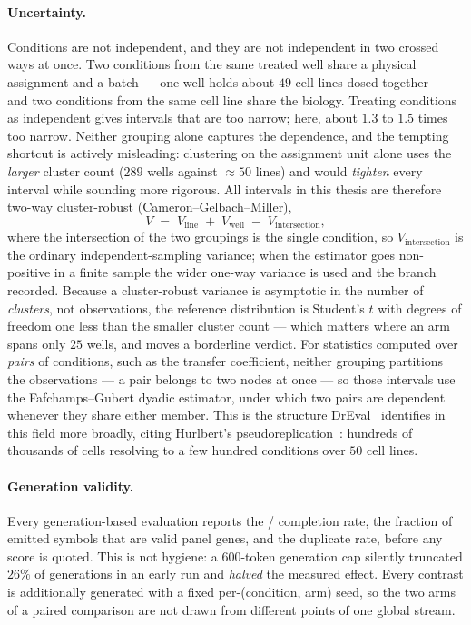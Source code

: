 \paragraph{Uncertainty.} Conditions are not independent, and they are not independent in two
crossed ways at once. Two conditions from the same treated well share a physical assignment and a
batch --- one well holds about $49$ cell lines dosed together --- and two conditions from the same
cell line share the biology. Treating conditions as independent gives intervals that are too
narrow; here, about $1.3$ to $1.5$ times too narrow. Neither grouping alone captures the
dependence, and the tempting shortcut is actively misleading: clustering on the assignment unit
alone uses the \emph{larger} cluster count ($289$ wells against $\approx 50$ lines) and would
\emph{tighten} every interval while sounding more rigorous. All intervals in this thesis are
therefore two-way cluster-robust (Cameron--Gelbach--Miller),
\begin{equation}
  V \;=\; V_{\textrm{line}} \;+\; V_{\textrm{well}} \;-\; V_{\textrm{intersection}},
\end{equation}
where the intersection of the two groupings is the single condition, so $V_{\textrm{intersection}}$
is the ordinary independent-sampling variance; when the estimator goes non-positive in a finite
sample the wider one-way variance is used and the branch recorded. Because a cluster-robust
variance is asymptotic in the number of \emph{clusters}, not observations, the reference
distribution is Student's $t$ with degrees of freedom one less than the smaller cluster count ---
which matters where an arm spans only $25$ wells, and moves a borderline verdict. For statistics
computed over \emph{pairs} of conditions, such as the transfer coefficient, neither grouping
partitions the observations --- a pair belongs to two nodes at once --- so those intervals use the
Fafchamps--Gubert dyadic estimator, under which two pairs are dependent whenever they share either
member. This is the structure DrEval~\cite{dreval} identifies in this field more broadly, citing
Hurlbert's pseudoreplication~\cite{hurlbert}: hundreds of thousands of cells resolving to a few
hundred conditions over $50$ cell lines.

\paragraph{Generation validity.} Every generation-based evaluation reports the \ENDCELL{}/\DOWN{}
completion rate, the fraction of emitted symbols that are valid panel genes, and the duplicate rate,
before any score is quoted. This is not hygiene: a $600$-token generation cap silently truncated
$26\%$ of generations in an early run and \emph{halved} the measured effect. Every contrast is
additionally generated with a fixed per-(condition, arm) seed, so the two arms of a paired
comparison are not drawn from different points of one global stream.

